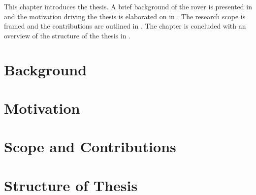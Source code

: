 This chapter introduces the thesis. A brief background of the rover is presented in  and the motivation driving the thesis is elaborated on in . The research scope is framed and the contributions are outlined in . The chapter is concluded with an overview of the structure of the thesis in .

\section{Background}
\label{sec:Introduction:Background}


\section{Motivation}
\label{sec:Introduction:Motivation}


\section{Scope and Contributions}
\label{sec:Introduction:ScopeAndContributions}


%

\section{Structure of Thesis}
\label{sec:Introduction:StructureOfThesis}

